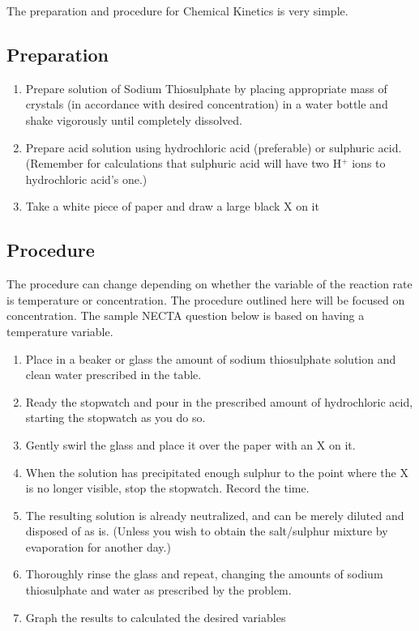 The preparation and procedure for Chemical Kinetics is very simple.

\subsection{Preparation}

\begin{enumerate}
\item Prepare solution of Sodium Thiosulphate by placing appropriate mass of crystals (in accordance with desired concentration) in a water bottle and shake vigorously until completely dissolved.
\item Prepare acid solution using hydrochloric acid (preferable) or sulphuric acid. (Remember for calculations that sulphuric acid will have two H$^+$ ions to hydrochloric acid's one.)
\item Take a white piece of paper and draw a large black X on it
\end{enumerate}

\subsection{Procedure}

The procedure can change depending on whether the variable of the reaction rate is temperature or concentration. The procedure outlined here will be focused on concentration. The sample NECTA question below is based on having a temperature variable.

\begin{enumerate}
\item Place in a beaker or glass the amount of sodium thiosulphate solution and clean water prescribed in the table.
\item Ready the stopwatch and pour in the prescribed amount of hydrochloric acid, starting the stopwatch as you do so.
\item Gently swirl the glass and place it over the paper with an X on it.
\item When the solution has precipitated enough sulphur to the point where the X is no longer visible, stop the stopwatch. Record the time.
\item The resulting solution is already neutralized, and can be merely diluted and disposed of as is. (Unless you wish to obtain the salt/sulphur mixture by evaporation for another day.)
\item Thoroughly rinse the glass and repeat, changing the amounts of sodium thiosulphate and water as prescribed by the problem.
\item Graph the results to calculated the desired variables
\end{enumerate}

